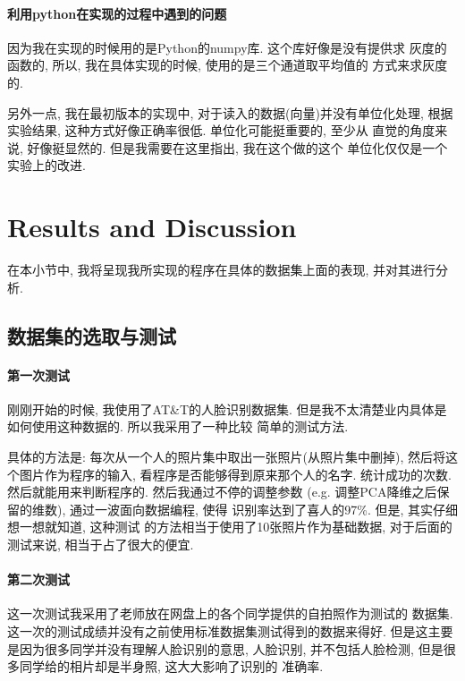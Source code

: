 \documentclass[fleqn,10pt]{SelfArx} %
\begin{document}
	\paragraph{利用python在实现的过程中遇到的问题}
		因为我在实现的时候用的是Python的numpy库. 这个库好像是没有提供求
		灰度的函数的, 所以, 我在具体实现的时候, 使用的是三个通道取平均值的
		方式来求灰度的.

		另外一点, 我在最初版本的实现中, 对于读入的数据(向量)并没有单位化处理,
		根据实验结果, 这种方式好像正确率很低. 单位化可能挺重要的, 至少从
		直觉的角度来说, 好像挺显然的. 但是我需要在这里指出, 我在这个做的这个
		单位化仅仅是一个实验上的改进.


\section{Results and Discussion}

在本小节中, 我将呈现我所实现的程序在具体的数据集上面的表现, 
并对其进行分析.
\subsection{数据集的选取与测试}
	\paragraph{第一次测试}
		刚刚开始的时候, 我使用了AT\&T的人脸识别数据集\cite{database}.
		但是我不太清楚业内具体是如何使用这种数据的. 所以我采用了一种比较
		简单的测试方法. 

		具体的方法是: 每次从一个人的照片集中取出一张照片(从照片集中删掉),
		然后将这个图片作为程序的输入, 看程序是否能够得到原来那个人的名字.
		统计成功的次数. 然后就能用来判断程序的. 然后我通过不停的调整参数
		(e.g. 调整PCA降维之后保留的维数), 通过一波面向数据编程, 使得
		识别率达到了喜人的97\%. 但是, 其实仔细想一想就知道, 这种测试
		的方法相当于使用了10张照片作为基础数据, 对于后面的测试来说,
		相当于占了很大的便宜.

	\paragraph{第二次测试}
		这一次测试我采用了老师放在网盘上的各个同学提供的自拍照作为测试的
		数据集. 这一次的测试成绩并没有之前使用标准数据集测试得到的数据来得好.
		但是这主要是因为很多同学并没有理解人脸识别的意思, 人脸识别,
		并不包括人脸检测, 但是很多同学给的相片却是半身照, 这大大影响了识别的
		准确率.
\end{document}
